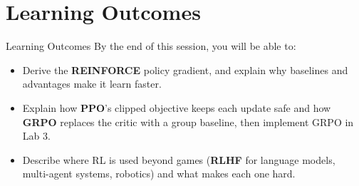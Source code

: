 \section{Learning Outcomes}
\begin{frame}{Learning Outcomes}
    By the end of this session, you will be able to:
    \vspace{0.5em}
    \begin{itemize}
        \setlength{\itemsep}{0.9em}
        \item Derive the \textbf{REINFORCE} policy gradient, and explain why baselines and advantages make it learn faster.
        \item Explain how \textbf{PPO}'s clipped objective keeps each update safe and how \textbf{GRPO} replaces the critic with a group baseline, then implement GRPO in Lab 3.
        \item Describe where RL is used beyond games (\textbf{RLHF} for language models, multi-agent systems, robotics) and what makes each one hard.
    \end{itemize}
\end{frame}
